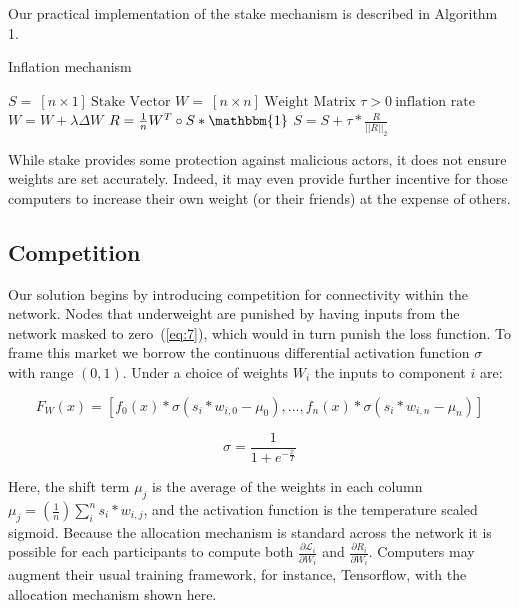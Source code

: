 \documentclass{article}
\begin{document}
Our practical implementation of the stake mechanism is described in Algorithm 1.  

\begin{algorithm}
	\caption{Inflation mechanism}
	\begin{algorithmic} 
		\REQUIRE $S = \ [n \times 1] \ \textrm{Stake Vector}$
		\REQUIRE $W = \ [n \times n] \ \textrm{Weight Matrix}$
		\REQUIRE $\tau > 0 \ \textrm{inflation rate}$
		\STATE $W = W + \lambda \Delta W$
		\STATE $R = \frac{1}{n} W^T \circ S * \mathbbm{1}$
		\STATE $S = S + \tau * \frac{R}{||R||_2}  $
		\ENDWHILE
	\end{algorithmic}
\end{algorithm}

While stake provides some protection against malicious actors, it does not ensure weights are set accurately. Indeed, it may even provide further incentive for those computers to increase their own weight (or their friends) at the expense of others. 

\subsection{Competition}
\label{sec:competitive_weights}

Our solution begins by introducing competition for connectivity within the network. Nodes that underweight are punished by having inputs from the network masked to zero~(\ref{eq:7}), which would in turn punish the loss function. To frame this market we borrow the continuous differential activation function $\sigma$ with range $(0,1)$. Under a choice of weights $W_i$ the inputs to component $i$ are:

\begin{equation}
\label{eq:7}
F_W(x) =  [f_0(x) * \sigma(s_i * w_{i,0} - \mu_0),  ... , f_n(x) * \sigma(s_i * w_{i,n} - \mu_n)]
\end{equation}

\begin{equation}
\sigma =  \frac{1}{ 1 + e^{-\frac{x}{T}} }
\end{equation}

Here, the shift term $\mu_j$ is the average of the weights in each column $\mu_j = (\frac{1}{n}) \sum_{i}^{n}{s_i * w_{i,j}}$, and the activation function is the temperature scaled sigmoid. Because the allocation mechanism is standard across the network it is possible for each participants to compute both $\frac{\partial \mathcal{L}_i}{\partial W_i}$ and $\frac{\partial R_i}{\partial W_i}$. Computers may augment their usual training framework, for instance, Tensorflow, with the allocation mechanism shown here. 
\end{document}
